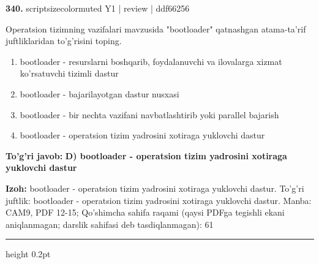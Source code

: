 \documentclass[10pt,a4paper]{article}
\begin{document}
{\bfseries\sffamily\color{ink} 340.} {scriptsizecolor{muted} Y1 | review | ddf66256}
\par
Operatsion tizimning vazifalari mavzusida "bootloader" qatnashgan atama-ta'rif juftliklaridan to'g'risini toping.
\begin{enumerate}[label=\Alph*),leftmargin=9mm]
\item bootloader - resurslarni boshqarib, foydalanuvchi va ilovalarga xizmat ko'rsatuvchi tizimli dastur
\item bootloader - bajarilayotgan dastur nusxasi
\item bootloader - bir nechta vazifani navbatlashtirib yoki parallel bajarish
\item bootloader - operatsion tizim yadrosini xotiraga yuklovchi dastur
\end{enumerate}
\begin{tcolorbox}[enhanced,breakable,colback=teal!4,colframe=teal!60!black,boxrule=0.45pt,arc=1.2mm,left=2.7mm,right=2.7mm,top=1.8mm,bottom=1.8mm,before skip=2mm,after skip=2mm]
{\bfseries\sffamily\color{teal}To'g'ri javob:} \textbf{D) bootloader - operatsion tizim yadrosini xotiraga yuklovchi dastur}
\par\smallskip
{\bfseries Izoh:} bootloader - operatsion tizim yadrosini xotiraga yuklovchi dastur. To'g'ri juftlik: bootloader - operatsion tizim yadrosini xotiraga yuklovchi dastur. Manba: CAM9, PDF 12-15; Qo'shimcha sahifa raqami (qaysi PDFga tegishli ekani aniqlanmagan; darslik sahifasi deb tasdiqlanmagan): 61
\end{tcolorbox}
\vspace{2mm}\hrule height 0.2pt\vspace{3mm}
\end{document}
